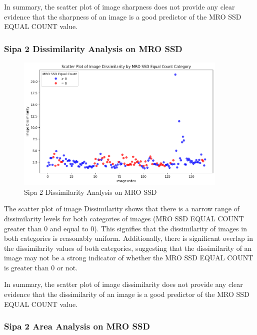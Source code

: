 In summary, the scatter plot of image sharpness does not provide any clear evidence that the sharpness of an image is a good predictor of the MRO SSD EQUAL COUNT value.

\newpage


\subsubsection{Sipa 2 Dissimilarity Analysis on MRO SSD}


\begin{figure}[ht]
    \centering
    \includegraphics[width=0.9\textwidth]{Figures/Results/sipa_02/dissimilarity.png}
    \caption[Sipa 2 Dissimilarity Analysis on MRO SSD]{Sipa 2 Dissimilarity Analysis on MRO SSD}
    \label{fig:Sipa 2 Dissimilarity Analysis on MRO SSD}
\end{figure}



The scatter plot of image Dissimilarity shows that there is a narrow range of dissimilarity levels for both categories of images (MRO SSD EQUAL COUNT greater than 0 and equal to 0). This signifies that the dissimilarity of images in both categories is reasonably uniform. Additionally, there is significant overlap in the dissimilarity values of both categories, suggesting that the dissimilarity of an image may not be a strong indicator of whether the MRO SSD EQUAL COUNT is greater than 0 or not.

In summary, the scatter plot of image dissimilarity does not provide any clear evidence that the dissimilarity of an image is a good predictor of the MRO SSD EQUAL COUNT value.


\newpage

\subsubsection{Sipa 2 Area Analysis on MRO SSD}


